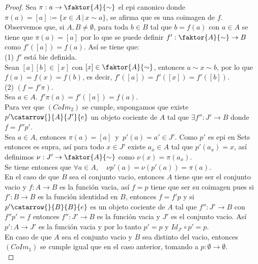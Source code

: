 \documentclass{article}
\begin{document}
\begin{enumerate}[label=\textbf{Ej \arabic*.}]
\begin{proof}
Sea $\pi:a\to \faktor{A}{\sim}$ el epi canonico donde $\pi(a)=[a]:=\{x\in A\,|\,x\sim a\}$, se afirma que es una coimagen de $f$.\\

Observemos que, si $A,B\neq \emptyset$, para toda $b\in B$ tal que $b=f(a)$ con $a\in A$ se tiene que $\pi(a)=[a]$ por lo que se puede definir 
$f': \faktor{A}{\sim}\to B$ como $f'([a])=f(a)$. Así se tiene que:\\

(1) $f'$ está bie definida.\\

Sean $[a][b]\in [x]$ con $[x]\in  \faktor{A}{\sim}$, entonces $a\sim x\sim b$, por lo que \\$f(a)=f(x)=f(b)$, es decir, $f'([a])=f'([x])=f'([b])$.\\

(2) $(f=f'\pi)$.\\

Sea $a\in A$. $f'\pi(a)=f'([a])=f(a)$.\\

Para ver que $(CoIm_2)$ se cumple, supongamos que existe $p'\catarrow{}{A}{J'}{e}$  un objeto cociente de $A$ tal que $\exists f'':J'\to B$ donde 
$f=f''p'$.\\
Sea $a\in A$, entonces $\pi(a)=[a]$\,\,\,y\,\,\,$p'(a)=a'\in J'$. Como $p'$ es epi en Sets entonces es supra, así para todo $x\in J'$ existe $a_x\in A$
tal que $p'(a_x)=x$, así definimos $\nu:J' \to \faktor{A}{\sim}$ como $\nu(x)=\pi(a_x)$.\\

Se tiene entonces que $\forall a\in A,\quad \nu p'(a)=\nu(p'(a))=\pi(a).$\\

En el caso de que $B$ sea el conjunto vacio, entonces $A$ tiene que ser el conjunto vacio y $f:A\to B$ es la función vacia, así $f=p$ tiene que ser su
coimagen pues si $f':B\to B$ es la función identidad en $B$, entonces $f=f'p$ y si $p'\catarrow{}{B}{B}{e}$ es un objeto cociente de $A$ tal que $f'':J'\to B$
con $f''p'=f$ entonces $f'':J'\to B$ es la función vacia y $J'$ es el conjunto vacio. Así $p':A\to J'$ es la función vacia y por lo tanto $p'=p$ y 
$Id_{J'}\circ p'=p$.\\

En caso de que $A$ sea el conjunto vacio y $B$ sea distinto del vacio, entonces $(CoIm_1)$ se cumple igual que en el caso anterior, tomando a 
$p: \emptyset\to  \emptyset$.\\


\end{proof}
\end{enumerate}
\end{document}
